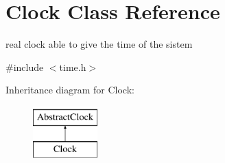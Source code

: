\hypertarget{classClock}{
\section{Clock Class Reference}
\label{classClock}
}


real clock able to give the time of the sistem  




{\ttfamily \#include $<$time.h$>$}

Inheritance diagram for Clock:\begin{figure}[H]
\begin{center}
\leavevmode
\includegraphics[height=2.000000cm]{classClock}
\end{center}
\end{figure}
